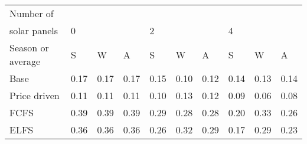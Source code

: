 \begin{table}[h] 
\centering 
\begin{tabular}{l|lll|lll|lll}Number of \\ solar panels&0& & &2& & &4& & \\ \hline 
Season or average & S & W & A & S & W & A & S & W & A \\ \hline 
Base&0.17&0.17&0.17&0.15&0.10&0.12&0.14&0.13&0.14 \\ 
Price driven&0.11&0.11&0.11&0.10&0.13&0.12&0.09&0.06&0.08 \\ 
FCFS&0.39&0.39&0.39&0.29&0.28&0.28&0.20&0.33&0.26 \\ 
ELFS&0.36&0.36&0.36&0.26&0.32&0.29&0.17&0.29&0.23 \\ 
\end{tabular} 
\end{table}